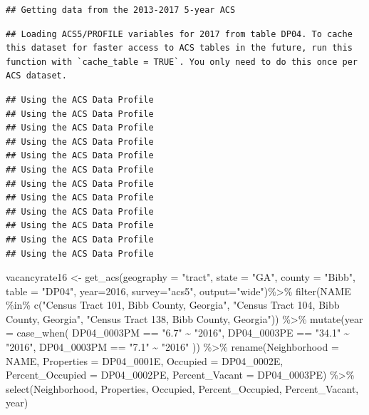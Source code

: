 \documentclass[
]{article}
\newenvironment{Shaded}{\begin{snugshade}}{\end{snugshade}}
\newcommand{\AttributeTok}[1]{\textcolor[rgb]{0.77,0.63,0.00}{#1}}
\newcommand{\DecValTok}[1]{\textcolor[rgb]{0.00,0.00,0.81}{#1}}
\newcommand{\FunctionTok}[1]{\textcolor[rgb]{0.00,0.00,0.00}{#1}}
\newcommand{\NormalTok}[1]{#1}
\newcommand{\OtherTok}[1]{\textcolor[rgb]{0.56,0.35,0.01}{#1}}
\newcommand{\SpecialCharTok}[1]{\textcolor[rgb]{0.00,0.00,0.00}{#1}}
\newcommand{\StringTok}[1]{\textcolor[rgb]{0.31,0.60,0.02}{#1}}
\begin{document}
\begin{verbatim}
## Getting data from the 2013-2017 5-year ACS
\end{verbatim}

\begin{verbatim}
## Loading ACS5/PROFILE variables for 2017 from table DP04. To cache this dataset for faster access to ACS tables in the future, run this function with `cache_table = TRUE`. You only need to do this once per ACS dataset.
\end{verbatim}

\begin{verbatim}
## Using the ACS Data Profile
## Using the ACS Data Profile
## Using the ACS Data Profile
## Using the ACS Data Profile
## Using the ACS Data Profile
## Using the ACS Data Profile
## Using the ACS Data Profile
## Using the ACS Data Profile
## Using the ACS Data Profile
## Using the ACS Data Profile
## Using the ACS Data Profile
## Using the ACS Data Profile
\end{verbatim}

\begin{Shaded}
\begin{Highlighting}[]
\NormalTok{vacancyrate16 }\OtherTok{\textless{}{-}} \FunctionTok{get\_acs}\NormalTok{(}\AttributeTok{geography =} \StringTok{"tract"}\NormalTok{, }\AttributeTok{state =} \StringTok{"GA"}\NormalTok{, }\AttributeTok{county =} \StringTok{"Bibb"}\NormalTok{, }\AttributeTok{table =} \StringTok{"DP04"}\NormalTok{,  }\AttributeTok{year=}\DecValTok{2016}\NormalTok{, }\AttributeTok{survey=}\StringTok{"acs5"}\NormalTok{, }\AttributeTok{output=}\StringTok{"wide"}\NormalTok{)}\SpecialCharTok{\%\textgreater{}\%}
\FunctionTok{filter}\NormalTok{(NAME }\SpecialCharTok{\%in\%} \FunctionTok{c}\NormalTok{(}\StringTok{"Census Tract 101, Bibb County, Georgia"}\NormalTok{, }\StringTok{"Census Tract 104, Bibb County, Georgia"}\NormalTok{, }\StringTok{"Census Tract 138, Bibb County, Georgia"}\NormalTok{)) }\SpecialCharTok{\%\textgreater{}\%}
  \FunctionTok{mutate}\NormalTok{(}\AttributeTok{year =} \FunctionTok{case\_when}\NormalTok{(}
\NormalTok{    DP04\_0003PM }\SpecialCharTok{==} \StringTok{"6.7"} \SpecialCharTok{\textasciitilde{}} \StringTok{"2016"}\NormalTok{,}
\NormalTok{    DP04\_0003PE }\SpecialCharTok{==} \StringTok{"34.1"} \SpecialCharTok{\textasciitilde{}} \StringTok{"2016"}\NormalTok{,}
\NormalTok{    DP04\_0003PM }\SpecialCharTok{==} \StringTok{"7.1"} \SpecialCharTok{\textasciitilde{}} \StringTok{"2016"}
\NormalTok{  )) }\SpecialCharTok{\%\textgreater{}\%}
  \FunctionTok{rename}\NormalTok{(}\AttributeTok{Neighborhood =}\NormalTok{ NAME,}
         \AttributeTok{Properties =}\NormalTok{ DP04\_0001E,}
         \AttributeTok{Occupied =}\NormalTok{ DP04\_0002E,}
         \AttributeTok{Percent\_Occupied =}\NormalTok{ DP04\_0002PE,}
         \AttributeTok{Percent\_Vacant =}\NormalTok{ DP04\_0003PE) }\SpecialCharTok{\%\textgreater{}\%}
   \FunctionTok{select}\NormalTok{(Neighborhood, Properties, Occupied, Percent\_Occupied, Percent\_Vacant, year) }
\end{Highlighting}
\end{Shaded}
\end{document}
